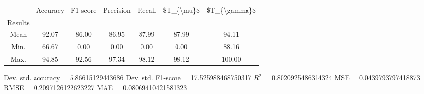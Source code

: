 \begin{tabular}{|c|c|c|c|c|c|c|}
\toprule
{} &  Accuracy &  F1 score &  Precision &  Recall &  \$T\_\{\textbackslash mu\}\$ &  \$T\_\{\textbackslash gamma\}\$ \\
Results &           &           &            &         &            &               \\
\hline
Mean    &     92.07 &     86.00 &      86.95 &   87.99 &      87.99 &         94.11 \\
Min.    &     66.67 &      0.00 &       0.00 &    0.00 &       0.00 &         88.16 \\
Max.    &     94.85 &     92.56 &      97.34 &   98.12 &      98.12 &        100.00 \\
\bottomrule
\end{tabular}

 Dev. std. accuracy = 5.86615129443686
 Dev. std. F1-score = 17.525988468750317
 $R^2$ = 0.8020925486314324
 MSE = 0.0439793797418873
 RMSE = 0.2097126122623227
 MAE = 0.08069410421581323